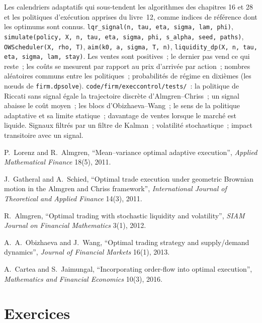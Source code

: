 \begin{build}
 Les calendriers adaptatifs qui sous-tendent les algorithmes des chapitres 16 et 28 et les politiques d'exécution apprises du livre~12, comme indices de référence dont
les optimums sont connus.
 \texttt{lqr\_signal(n, tau, eta, sigma, lam, phi)}, \texttt{simulate(policy, X, n, tau, eta, sigma, phi, s\_alpha, seed, paths)},
\texttt{OWScheduler(X, rho, T)}, \texttt{aim(k0, a, sigma, T, n)}, \texttt{liquidity\_dp(X, n, tau, eta, sigma, lam, stay)}.
 Les ventes sont positives~; le dernier pas vend ce qui reste~; les coûts se mesurent par rapport au prix d'arrivée par action~; nombres aléatoires communs entre les politiques~;
probabilités de régime en dixièmes (les nœuds de \texttt{firm.dpsolve}).
 \texttt{code/firm/execcontrol/tests/}~: la politique de Riccati sans signal égale la trajectoire discrète d'Almgren--Chriss~; un
signal abaisse le coût moyen~; les blocs d'Obizhaeva--Wang~; le sens de la politique adaptative et sa limite statique~; davantage de ventes lorsque le marché est liquide.
 Signaux filtrés par un filtre de Kalman~; volatilité stochastique~; impact transitoire avec un signal.
\end{build}

\begin{omsources}
\item P.~Lorenz and R.~Almgren, ``Mean--variance optimal adaptive execution'', \emph{Applied Mathematical Finance} 18(5), 2011.
\item J.~Gatheral and A.~Schied, ``Optimal trade execution under geometric Brownian motion in the Almgren and Chriss framework'', \emph{International
Journal of Theoretical and Applied Finance} 14(3), 2011.
\item R.~Almgren, ``Optimal trading with stochastic liquidity and volatility'', \emph{SIAM Journal on Financial Mathematics} 3(1), 2012.
\item A.~A.~Obizhaeva and J.~Wang, ``Optimal trading strategy and supply/demand dynamics'', \emph{Journal of Financial Markets} 16(1), 2013.
\item A.~Cartea and S.~Jaimungal, ``Incorporating order-flow into optimal execution'', \emph{Mathematics and Financial Economics} 10(3), 2016.
\end{omsources}

\section{Exercices}

